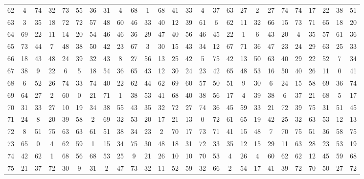 \begin{table}
\begin{tabular}{c c c c c c c c c c c c c c c c c c c c c c c c c c }
62 & 4 & 74 & 32 & 73 & 55 & 36 & 31 & 4 & 68 & 1 & 68 & 41 & 33 & 4 & 37 & 63 & 27 & 2 & 27 & 74 & 74 & 17 & 22 & 38 & 51 \\
63 & 3 & 35 & 18 & 72 & 72 & 57 & 48 & 60 & 46 & 33 & 40 & 12 & 39 & 61 & 6 & 62 & 11 & 32 & 66 & 15 & 73 & 71 & 65 & 18 & 20 \\
64 & 69 & 22 & 11 & 14 & 20 & 54 & 46 & 46 & 36 & 29 & 47 & 40 & 56 & 46 & 45 & 22 & 1 & 6 & 43 & 20 & 4 & 35 & 57 & 61 & 36 \\
65 & 73 & 44 & 7 & 48 & 38 & 50 & 42 & 23 & 67 & 3 & 30 & 15 & 43 & 34 & 12 & 67 & 71 & 36 & 47 & 23 & 24 & 29 & 63 & 25 & 33 \\
66 & 18 & 43 & 48 & 24 & 39 & 32 & 43 & 8 & 27 & 56 & 13 & 25 & 42 & 5 & 75 & 42 & 13 & 50 & 63 & 40 & 29 & 22 & 52 & 7 & 34 \\
67 & 38 & 9 & 22 & 6 & 5 & 18 & 54 & 36 & 65 & 43 & 12 & 30 & 24 & 23 & 42 & 65 & 48 & 53 & 16 & 50 & 40 & 26 & 11 & 0 & 41 \\
68 & 6 & 52 & 26 & 74 & 33 & 74 & 40 & 22 & 62 & 44 & 62 & 69 & 60 & 57 & 50 & 51 & 9 & 30 & 6 & 24 & 15 & 58 & 69 & 36 & 74 \\
69 & 64 & 27 & 2 & 60 & 0 & 21 & 71 & 1 & 38 & 53 & 41 & 68 & 40 & 38 & 56 & 17 & 4 & 39 & 38 & 6 & 37 & 21 & 68 & 5 & 17 \\
70 & 31 & 33 & 27 & 10 & 19 & 34 & 38 & 55 & 43 & 35 & 32 & 72 & 27 & 74 & 36 & 45 & 59 & 33 & 21 & 72 & 39 & 75 & 31 & 51 & 45 \\
71 & 24 & 8 & 20 & 39 & 58 & 2 & 69 & 32 & 53 & 20 & 17 & 21 & 13 & 0 & 72 & 61 & 65 & 19 & 42 & 25 & 32 & 63 & 53 & 12 & 13 \\
72 & 8 & 51 & 75 & 63 & 63 & 61 & 51 & 38 & 34 & 23 & 2 & 70 & 17 & 73 & 71 & 41 & 15 & 48 & 7 & 70 & 75 & 51 & 36 & 58 & 75 \\
73 & 65 & 0 & 4 & 62 & 59 & 1 & 15 & 34 & 75 & 30 & 48 & 18 & 31 & 72 & 33 & 35 & 12 & 15 & 29 & 11 & 63 & 28 & 23 & 53 & 19 \\
74 & 42 & 62 & 1 & 68 & 56 & 68 & 53 & 25 & 9 & 21 & 26 & 10 & 10 & 70 & 53 & 4 & 26 & 4 & 60 & 62 & 62 & 12 & 45 & 59 & 68 \\
75 & 21 & 37 & 72 & 30 & 9 & 31 & 2 & 47 & 73 & 32 & 11 & 52 & 59 & 32 & 66 & 2 & 54 & 17 & 41 & 39 & 72 & 70 & 50 & 27 & 72 \\
\hline
\end{tabular}
\end{table}